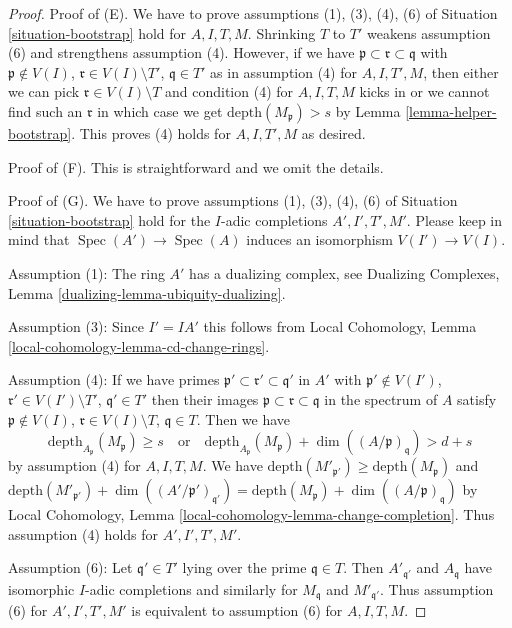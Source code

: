 \documentclass{stacks-project}
\theoremstyle{plain}
\theoremstyle{definition}
\theoremstyle{remark}
\numberwithin{equation}{subsection}
\def\Spec{\mathop{\mathrm{Spec}}}
\begin{document}
\begin{proof}
Proof of (E). We have to prove assumptions (1), (3), (4), (6)
of Situation \ref{situation-bootstrap} hold for
$A, I, T, M$. Shrinking $T$ to $T'$
weakens assumption (6) and strengthens assumption (4). However, if we have
$\mathfrak p \subset \mathfrak r \subset \mathfrak q$ with
$\mathfrak p \not \in V(I)$, $\mathfrak r \in V(I) \setminus T'$,
$\mathfrak q \in T'$ as in assumption (4) for $A, I, T', M$, then
either we can pick $\mathfrak r \in V(I) \setminus T$ and
condition (4) for $A, I, T, M$ kicks in or we cannot
find such an $\mathfrak r$ in which case we get
$\text{depth}(M_\mathfrak p) > s$ by Lemma \ref{lemma-helper-bootstrap}.
This proves (4) holds for $A, I, T', M$ as desired.

\medskip\noindent
Proof of (F). This is straightforward and we omit the details.

\medskip\noindent
Proof of (G). We have to prove assumptions (1), (3), (4), (6)
of Situation \ref{situation-bootstrap} hold for the $I$-adic
completions $A', I', T', M'$. Please keep in mind that
$\Spec(A') \to \Spec(A)$ induces an isomorphism $V(I') \to V(I)$.

\medskip\noindent
Assumption (1): The ring $A'$ has a dualizing complex, see
Dualizing Complexes, Lemma \ref{dualizing-lemma-ubiquity-dualizing}.

\medskip\noindent
Assumption (3): Since $I' = IA'$ this follows from Local Cohomology,
Lemma \ref{local-cohomology-lemma-cd-change-rings}.

\medskip\noindent
Assumption (4): If we have primes
$\mathfrak p' \subset \mathfrak r' \subset \mathfrak q'$ in $A'$
with $\mathfrak p' \not \in V(I')$,
$\mathfrak r' \in V(I') \setminus T'$,
$\mathfrak q' \in T'$ then their images
$\mathfrak p \subset \mathfrak r \subset \mathfrak q$ in
the spectrum of $A$
satisfy
$\mathfrak p \not \in V(I)$, $\mathfrak r \in V(I) \setminus T$,
$\mathfrak q \in T$.
Then we have
$$
\text{depth}_{A_\mathfrak p}(M_\mathfrak p) \geq s
\quad\text{or}\quad
\text{depth}_{A_\mathfrak p}(M_\mathfrak p) +
\dim((A/\mathfrak p)_\mathfrak q) > d + s
$$
by assumption (4) for $A, I, T, M$. We have
$\text{depth}(M'_{\mathfrak p'}) \geq \text{depth}(M_\mathfrak p)$ and
$\text{depth}(M'_{\mathfrak p'}) +
\dim((A'/\mathfrak p')_{\mathfrak q'}) =
\text{depth}(M_\mathfrak p) +
\dim((A/\mathfrak p)_\mathfrak q)$
by Local Cohomology, Lemma \ref{local-cohomology-lemma-change-completion}.
Thus assumption (4) holds for $A', I', T', M'$.

\medskip\noindent
Assumption (6): Let $\mathfrak q' \in T'$ lying over the
prime $\mathfrak q \in T$. Then $A'_{\mathfrak q'}$
and $A_\mathfrak q$ have isomorphic $I$-adic completions
and similarly for $M_\mathfrak q$ and $M'_{\mathfrak q'}$.
Thus assumption (6) for $A', I', T', M'$ is equivalent
to assumption (6) for $A, I, T, M$.


\end{proof}
\end{document}
